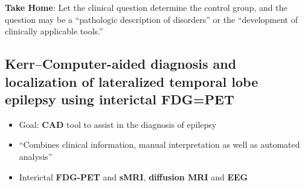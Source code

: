 \documentclass{article}
\begin{document}
        \textbf{Take Home}: Let the clinical question determine the control 
group, and
        the question may be a ``pathologic description of disorders'' or the
        ``development of clinically applicable tools.''  

        \subsection{Kerr--Computer-aided diagnosis and localization of
lateralized temporal lobe epilepsy using interictal FDG=PET}
        \begin{itemize}
            \item Goal: \textbf{CAD} tool to assist in the diagnosis of epilepsy        
            \item ``Combines clinical information, manual interpretation as well
as automated analysis'' 
            \item Interictal \textbf{FDG-PET} and \textbf{sMRI},
\textbf{diffusion MRI} and \textbf{EEG}
        \end{itemize}
\end{document}
